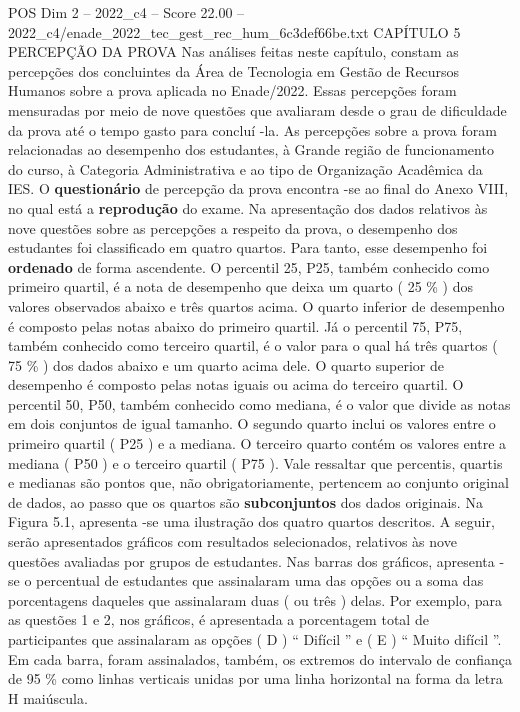 \begin{textsample}{POS Dim 2 – 2022\_c4 – Score 22.00 – 2022\_c4/enade\_2022\_tec\_gest\_rec\_hum\_6c3def66be.txt}  \label{ex:f2_pos_024}
CAPÍTULO 5 PERCEPÇÃO DA PROVA Nas análises feitas neste capítulo, constam as percepções dos concluintes da Área de Tecnologia em Gestão de Recursos Humanos sobre a prova aplicada no Enade/2022.
Essas percepções foram mensuradas por meio de nove questões que avaliaram desde o grau de dificuldade da prova até o tempo gasto para concluí -la.
As percepções sobre a prova foram relacionadas ao desempenho dos estudantes, à Grande região de funcionamento do curso, à Categoria Administrativa e ao tipo de Organização Acadêmica da IES.
O \textbf{questionário} de percepção da prova encontra -se ao final do Anexo VIII, no qual está a \textbf{reprodução} do exame.
Na apresentação dos dados relativos às nove questões sobre as percepções a respeito da prova, o desempenho dos estudantes foi classificado em quatro quartos.
Para tanto, esse desempenho foi \textbf{ordenado} de forma ascendente.
O percentil 25, P25, também conhecido como primeiro quartil, é a nota de desempenho que deixa um quarto ( 25 \% ) dos valores observados abaixo e três quartos acima.
O quarto inferior de desempenho é composto pelas notas abaixo do primeiro quartil.
Já o percentil 75, P75, também conhecido como terceiro quartil, é o valor para o qual há três quartos ( 75 \% ) dos dados abaixo e um quarto acima dele.
O quarto superior de desempenho é composto pelas notas iguais ou acima do terceiro quartil.
O percentil 50, P50, também conhecido como mediana, é o valor que divide as notas em dois conjuntos de igual tamanho.
O segundo quarto inclui os valores entre o primeiro quartil ( P25 ) e a mediana.
O terceiro quarto contém os valores entre a mediana ( P50 ) e o terceiro quartil ( P75 ).
Vale ressaltar que percentis, quartis e medianas são pontos que, não obrigatoriamente, pertencem ao conjunto original de dados, ao passo que os quartos são \textbf{subconjuntos} dos dados originais.
Na Figura 5.1, apresenta -se uma ilustração dos quatro quartos descritos.
A seguir, serão apresentados gráficos com resultados selecionados, relativos às nove questões avaliadas por grupos de estudantes.
Nas barras dos gráficos, apresenta -se o percentual de estudantes que assinalaram uma das opções ou a soma das porcentagens daqueles que assinalaram duas ( ou três ) delas.
Por exemplo, para as questões 1 e 2, nos gráficos, é apresentada a porcentagem total de participantes que assinalaram as opções ( D ) “ Difícil ” e ( E ) “ Muito difícil ”.
Em cada barra, foram assinalados, também, os extremos do intervalo de confiança de 95 \% como linhas verticais unidas por uma linha horizontal na forma da letra H maiúscula.

\end{textsample}
